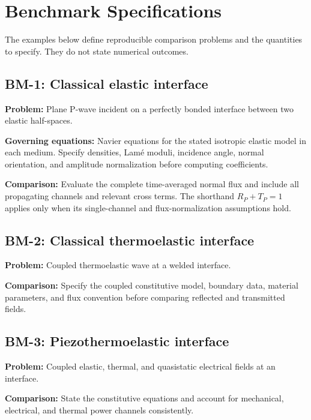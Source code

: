 \section{Benchmark Specifications}
\label{app:benchmarks}

The examples below define reproducible comparison problems and the quantities to specify. They do not state numerical outcomes.

\subsection{BM-1: Classical elastic interface}

\textbf{Problem:} Plane P-wave incident on a perfectly bonded interface between two elastic half-spaces.

\textbf{Governing equations:} Navier equations for the stated isotropic elastic model in each medium. Specify densities, Lam\'e moduli, incidence angle, normal orientation, and amplitude normalization before computing coefficients.

\textbf{Comparison:} Evaluate the complete time-averaged normal flux and include all propagating channels and relevant cross terms. The shorthand $R_P+T_P=1$ applies only when its single-channel and flux-normalization assumptions hold.

\subsection{BM-2: Classical thermoelastic interface}

\textbf{Problem:} Coupled thermoelastic wave at a welded interface.

\textbf{Comparison:} Specify the coupled constitutive model, boundary data, material parameters, and flux convention before comparing reflected and transmitted fields.

\subsection{BM-3: Piezothermoelastic interface}

\textbf{Problem:} Coupled elastic, thermal, and quasistatic electrical fields at an interface.

\textbf{Comparison:} State the constitutive equations and account for mechanical, electrical, and thermal power channels consistently.

